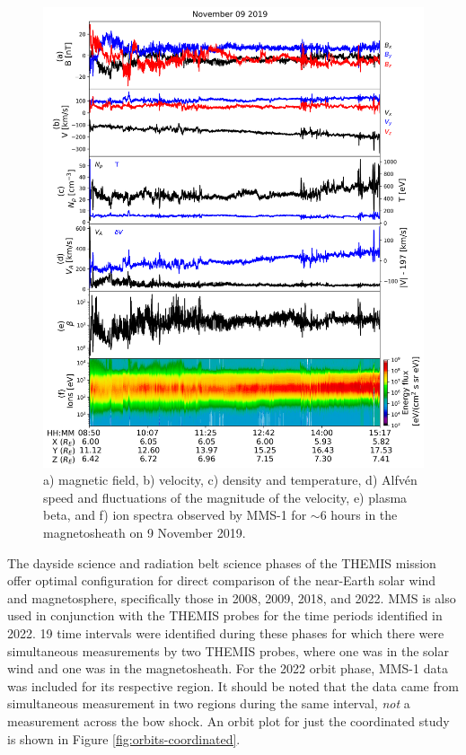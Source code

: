 \begin{figure}
    \centering
    \includegraphics[width=\textwidth]{Figures/Time series/timeseries_09112019_MMS1.png}
    \caption[Time series data for MMS-1 on 9 November 2019]{a) magnetic field, b) velocity, c) density and temperature, d) Alfv\'en speed and fluctuations of the magnitude of the velocity, e) plasma beta, and f) ion spectra observed by MMS-1 for $\sim$6 hours in the magnetosheath on 9 November 2019.}
    \label{fig:timeseries-MMS-magnetosheath}
\end{figure}

The dayside science and radiation belt science phases of the THEMIS mission offer optimal configuration for direct comparison of the near-Earth solar wind and magnetosphere, specifically those in 2008, 2009, 2018, and 2022. MMS is also used in conjunction with the THEMIS probes for the time periods identified in 2022. 19 time intervals were identified during these phases for which there were simultaneous measurements by two THEMIS probes, where one was in the solar wind and one was in the magnetosheath. For the 2022 orbit phase, MMS-1 data was included for its respective region. It should be noted that the data came from simultaneous measurement in two regions during the same interval, \textit{not} a measurement across the bow shock. An orbit plot for just the coordinated study is shown in Figure \ref{fig:orbits-coordinated}.

